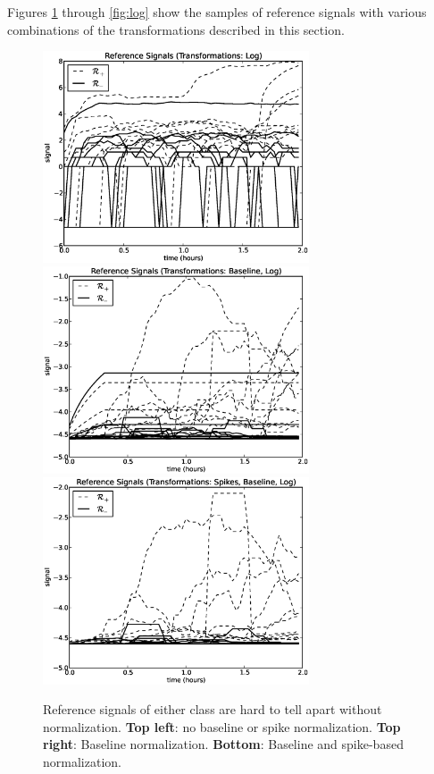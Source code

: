 Figures \ref{fig:baseline_spikes} through \ref{fig:log} show the samples of
reference signals with various combinations of the transformations described in
this section.
\begin{figure}[h!]
\begin{center}
\includegraphics[width=3.10in]{../fig/final/signal_transform/log.eps}\includegraphics[width=3.10in]{../fig/final/signal_transform/log_baseline.eps}
\includegraphics[width=3.10in]{../fig/final/signal_transform/log_baseline_spikes.eps}
\end{center}
\caption{\label{fig:baseline_spikes} Reference signals of either class are hard to tell apart without normalization. {\bf Top left}: no baseline or spike normalization. {\bf Top right}: Baseline normalization. {\bf Bottom}: Baseline and spike-based normalization.}
\end{figure}

